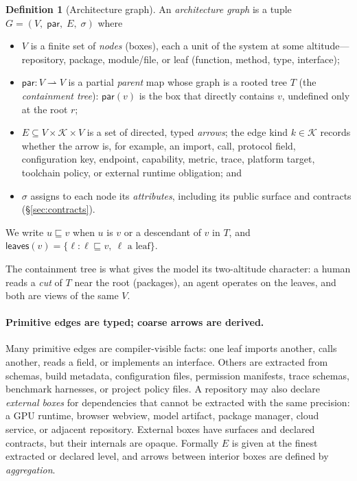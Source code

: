\documentclass[sigconf,review,anonymous]{acmart}
\theoremstyle{plain}
\theoremstyle{definition}
\newtheorem{definition}[theorem]{Definition}
\begin{document}
\begin{definition}[Architecture graph]\label{def:graph}
An \emph{architecture graph} is a tuple
$G = (V,\;\mathsf{par},\;E,\;\sigma)$ where
\begin{itemize}[leftmargin=1.4em,itemsep=1pt,topsep=2pt]
\item $V$ is a finite set of \emph{nodes} (boxes), each a unit of the system
at some altitude---repository, package, module/file, or leaf
(function, method, type, interface);
\item $\mathsf{par}:V \rightharpoonup V$ is a partial \emph{parent} map whose
graph is a rooted tree $T$ (the \emph{containment tree}): $\mathsf{par}(v)$ is
the box that directly contains $v$, undefined only at the root $r$;
\item $E \subseteq V \times \mathcal{K} \times V$ is a set of directed,
typed \emph{arrows}; the edge kind $k\in\mathcal{K}$ records whether the arrow
is, for example, an import, call, protocol field, configuration key, endpoint,
capability, metric, trace, platform target, toolchain policy, or external
runtime obligation; and
\item $\sigma$ assigns to each node its \emph{attributes}, including its
public surface and contracts (\S\ref{sec:contracts}).
\end{itemize}
We write $u \sqsubseteq v$ when $u$ is $v$ or a descendant of $v$ in $T$, and
$\mathsf{leaves}(v)=\{\ell : \ell \sqsubseteq v,\ \ell \text{ a leaf}\}$.
\end{definition}

The containment tree is what gives the model its two-altitude character: a
human reads a \emph{cut} of $T$ near the root (packages), an agent operates on
the leaves, and both are views of the same $V$.

\paragraph{Primitive edges are typed; coarse arrows are derived.}
Many primitive edges are compiler-visible facts: one leaf imports another,
calls another, reads a field, or implements an interface. Others are extracted
from schemas, build metadata, configuration files, permission manifests, trace
schemas, benchmark harnesses, or project policy files. A repository may also
declare \emph{external boxes} for dependencies that cannot be extracted with the
same precision: a GPU runtime, browser webview, model artifact, package
manager, cloud service, or adjacent repository. External boxes have surfaces
and declared contracts, but their internals are opaque. Formally $E$ is given at
the finest extracted or declared level, and arrows between interior boxes are
defined by \emph{aggregation}.
\end{document}
